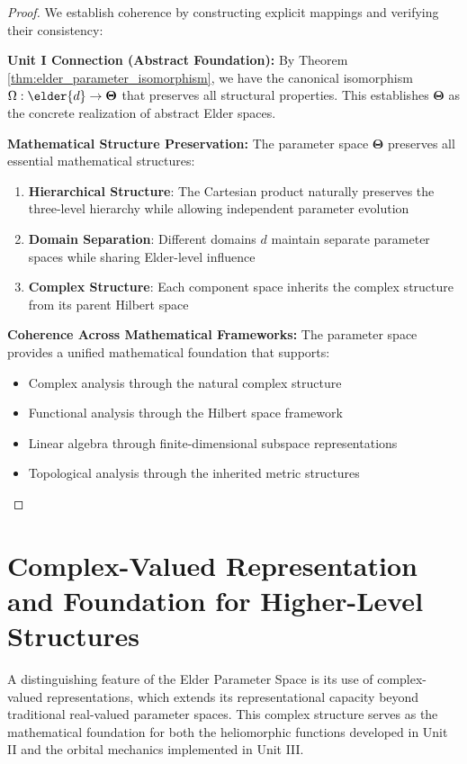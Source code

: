 \begin{proof}
We establish coherence by constructing explicit mappings and verifying their consistency:

\textbf{Unit I Connection (Abstract Foundation):}
By Theorem \ref{thm:elder_parameter_isomorphism}, we have the canonical isomorphism $\Omega: \elder{d} \rightarrow \boldsymbol{\Theta}$ that preserves all structural properties. This establishes $\boldsymbol{\Theta}$ as the concrete realization of abstract Elder spaces.

\textbf{Mathematical Structure Preservation:}
The parameter space $\boldsymbol{\Theta}$ preserves all essential mathematical structures:
\begin{enumerate}
\item \textbf{Hierarchical Structure}: The Cartesian product naturally preserves the three-level hierarchy while allowing independent parameter evolution
\item \textbf{Domain Separation}: Different domains $d$ maintain separate parameter spaces while sharing Elder-level influence
\item \textbf{Complex Structure}: Each component space inherits the complex structure from its parent Hilbert space
\end{enumerate}

\textbf{Coherence Across Mathematical Frameworks:}
The parameter space provides a unified mathematical foundation that supports:
\begin{itemize}
\item Complex analysis through the natural complex structure
\item Functional analysis through the Hilbert space framework  
\item Linear algebra through finite-dimensional subspace representations
\item Topological analysis through the inherited metric structures
\end{itemize}
\end{proof}

\section{Complex-Valued Representation and Foundation for Higher-Level Structures}

A distinguishing feature of the Elder Parameter Space is its use of complex-valued representations, which extends its representational capacity beyond traditional real-valued parameter spaces. This complex structure serves as the mathematical foundation for both the heliomorphic functions developed in Unit II and the orbital mechanics implemented in Unit III.

